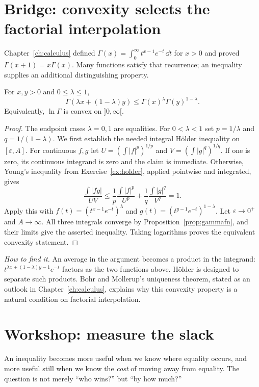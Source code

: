 \section{Bridge: convexity selects the factorial interpolation}\label{sec:gamma-convexity}
Chapter~\ref{ch:calculus} defined $\Gamma(x)=\int_0^\infty t^{x-1}e^{-t}\,\dd t$
for $x>0$ and proved $\Gamma(x+1)=x\Gamma(x)$. Many functions satisfy that
recurrence; an inequality supplies an additional distinguishing property.

\begin{proposition}\label{prop:gamma-convexity}
For $x,y>0$ and $0\le\lambda\le1$,
\[
\Gamma(\lambda x+(1-\lambda)y)
\le\Gamma(x)^\lambda\Gamma(y)^{1-\lambda}.
\]
Equivalently, $\ln\Gamma$ is convex on $]0,\infty[$.
\end{proposition}
\begin{proof}
The endpoint cases $\lambda=0,1$ are equalities. For $0<\lambda<1$ set
$p=1/\lambda$ and $q=1/(1-\lambda)$.
We first establish the needed integral H\"older inequality on $[\varepsilon,A]$.
For continuous $f,g$ let $U=(\int|f|^p)^{1/p}$ and
$V=(\int|g|^q)^{1/q}$. If one is zero, its continuous integrand is zero
and the claim is immediate. Otherwise, Young's inequality from
Exercise~\ref{ex:holder}, applied pointwise and integrated, gives
\[
\frac{\int|fg|}{UV}
\le\frac1p\frac{\int|f|^p}{U^p}
+\frac1q\frac{\int|g|^q}{V^q}=1.
\]
Apply this with $f(t)=(t^{x-1}e^{-t})^\lambda$ and
$g(t)=(t^{y-1}e^{-t})^{1-\lambda}$. Let $\varepsilon\to0^+$ and
$A\to\infty$. All three integrals converge by Proposition~\ref{prop:gammafn},
and their limits give the asserted inequality. Taking logarithms proves the
equivalent convexity statement.
\end{proof}

\emph{How to find it.} An average in the argument becomes a product in the
integrand: $t^{\lambda x+(1-\lambda)y-1}e^{-t}$ factors as the two functions
above. H\"older is designed to separate such products. Bohr and Mollerup's
uniqueness theorem, stated as an outlook in Chapter~\ref{ch:calculus}, explains
why this convexity property is a natural condition on factorial interpolation.

\section{Workshop: measure the slack}
An inequality becomes more useful when we know where equality occurs, and more useful still when we know the \emph{cost} of moving away from equality. The question is not merely ``who wins?'' but ``by how much?''

